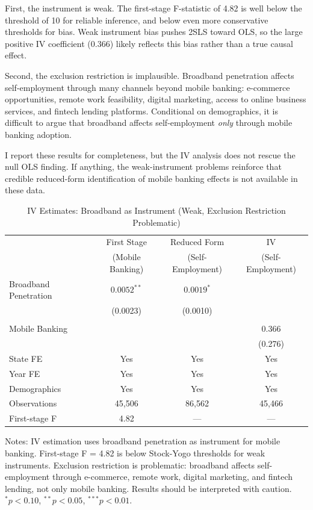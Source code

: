 \documentclass[12pt]{article}
\begin{document}
First, the instrument is weak. The first-stage F-statistic of 4.82 is well below the \citet{stock2002} threshold of 10 for reliable inference, and below even more conservative thresholds for bias. Weak instrument bias pushes 2SLS toward OLS, so the large positive IV coefficient (0.366) likely reflects this bias rather than a true causal effect.

Second, the exclusion restriction is implausible. Broadband penetration affects self-employment through many channels beyond mobile banking: e-commerce opportunities, remote work feasibility, digital marketing, access to online business services, and fintech lending platforms. Conditional on demographics, it is difficult to argue that broadband affects self-employment \textit{only} through mobile banking adoption.

I report these results for completeness, but the IV analysis does not rescue the null OLS finding. If anything, the weak-instrument problems reinforce that credible reduced-form identification of mobile banking effects is not available in these data.

\begin{table}[H]
\centering
\caption{IV Estimates: Broadband as Instrument (Weak, Exclusion Restriction Problematic)}
\label{tab:iv_results}
\begin{threeparttable}
\begin{tabular}{lccc}
\toprule
& First Stage & Reduced Form & IV \\
& (Mobile Banking) & (Self-Employment) & (Self-Employment) \\
\midrule
Broadband Penetration & $0.0052^{**}$ & $0.0019^{*}$ & \\
& (0.0023) & (0.0010) & \\
\\
Mobile Banking & & & 0.366 \\
& & & (0.276) \\
\midrule
State FE & Yes & Yes & Yes \\
Year FE & Yes & Yes & Yes \\
Demographics & Yes & Yes & Yes \\
\midrule
Observations & 45,506 & 86,562 & 45,466 \\
First-stage F & 4.82 & --- & --- \\
\bottomrule
\end{tabular}
\begin{tablenotes}
\small
\item Notes: IV estimation uses broadband penetration as instrument for mobile banking. First-stage F = 4.82 is below Stock-Yogo thresholds for weak instruments. Exclusion restriction is problematic: broadband affects self-employment through e-commerce, remote work, digital marketing, and fintech lending, not only mobile banking. Results should be interpreted with caution. $^{*}p<0.10$, $^{**}p<0.05$, $^{***}p<0.01$.
\end{tablenotes}
\end{threeparttable}
\end{table}
\end{document}
